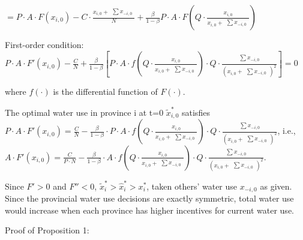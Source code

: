 \documentclass[preprint, 12pt]{elsarticle}
\begin{document}
$=P \cdot A \cdot F(x_{i,0})-C \cdot \frac{x_{i,0} + \begin{matrix} \sum x_{-i,0} \end{matrix}}{N}+\frac{\beta}{1-\beta} P \cdot A \cdot F(Q \cdot \frac{x_{i,0}}{x_{i,0} + \begin{matrix} \sum x_{-i,0} \end{matrix}})$

First-order condition: $P \cdot A \cdot F'(x_{i,0})-\frac{C}{N}+\frac{\beta}{1-\beta}[P \cdot A \cdot f(Q \cdot \frac{x_{i,0}}{x_{i,0} + \begin{matrix} \sum x_{-i,0} \end{matrix}}) \cdot Q \cdot \frac{\begin{matrix} \sum x_{-i,0} \end{matrix}}{(x_{i,0}+\begin{matrix} \sum  x_{-i,0} \end{matrix})^2}]=0$

where $f(\cdot)$ is the differential function of $F(\cdot)$.

The optimal water use in province i at t=0 $\widetilde x_{i,0}^*$ satisfies $P \cdot A \cdot F'(x_{i,0})=\frac{C}{N}-\frac{\beta}{1-\beta} \cdot P \cdot A \cdot f(Q \cdot \frac{x_{i,0}}{x_{i,0} + \begin{matrix} \sum x_{-i,0} \end{matrix}}) \cdot Q \cdot \frac{\begin{matrix} \sum x_{-i,0} \end{matrix}}{(x_{i,0} + \begin{matrix} \sum x_{-i,0} \end{matrix})^2}$,
i.e.,
$A \cdot F'(x_{i,0})=\frac{C}{P \cdot N} - \frac{\beta}{1-\beta} \cdot A \cdot f(Q \cdot \frac{x_{i,0}}{x_{i,0} + \begin{matrix} \sum x_{-i,0} \end{matrix}}) \cdot Q \cdot \frac{\begin{matrix} \sum x_{-i,0} \end{matrix}}{(x_{i,0} + \begin{matrix} \sum x_{-i,0} \end{matrix})^2}$.

Since $F'>0$ and $F''<0$, $\widetilde x_i^*>\hat x_i^*>x_i^*$, taken others' water use $x_{-i,0}$ as given. Since the provincial water use decisions are exactly symmetric, total water use would increase when each province has higher incentives for current water use.

Proof of Proposition 1:
\end{document}
